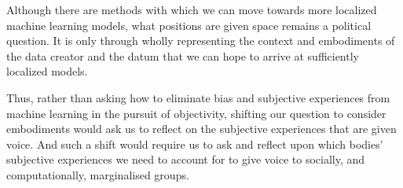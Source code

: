 Although there are methods with which we can move towards more localized machine learning models, what positions are given space remains a political question. It is only through wholly representing the context and embodiments of the data creator and the datum that we can hope to arrive at sufficiently localized models.

Thus, rather than asking how to eliminate bias and subjective experiences from machine learning in the pursuit of objectivity, shifting our question to consider embodiments would ask us to reflect on the subjective experiences that are given voice. And such a shift would require us to ask and reflect upon which bodies' subjective experiences we need to account for to give voice to socially, and computationally, marginalised groups.
%
%
